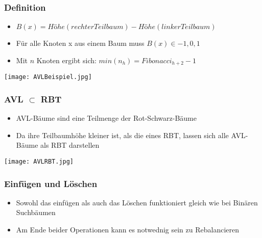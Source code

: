 		\subsubsection{Definition}
			\begin{minipage}{0.65\textwidth}
				\begin{itemize}
					\item $B(x) = Höhe(rechter Teilbaum) - Höhe(linker Teilbaum)$
					\item Für alle Knoten x aus einem Baum muss $B(x) \in {-1, 0, 1}$
					\item Mit $n$ Knoten ergibt sich: $ min(n_h) = Fibonacci_{h+2} - 1$
				\end{itemize}
			\end{minipage}
			\begin{minipage}{0.2\textwidth}
				\begin{center}
					\texttt{[image: AVLBeispiel.jpg]}
				\end{center}
			\end{minipage}

		\subsubsection{AVL $\subset$ RBT}
			\begin{minipage}{0.6\textwidth}
				\begin{itemize}
					\item AVL-Bäume sind eine Teilmenge der Rot-Schwarz-Bäume
					\item Da ihre Teilbaumhöhe kleiner ist, als die eines RBT, lassen sich alle AVL-Bäume
						als RBT darstellen
				\end{itemize}
			\end{minipage}
			\begin{minipage}{0.35\textwidth}
				\begin{center}
					\texttt{[image: AVLRBT.jpg]}
				\end{center}
			\end{minipage}


		\subsubsection{Einfügen und Löschen}
			\begin{itemize}
				\item Sowohl das einfügen als auch das Löschen funktioniert gleich wie bei Binären Suchbäumen
				\item Am Ende beider Operationen kann es notwednig sein zu Rebalancieren \\
			\end{itemize}

